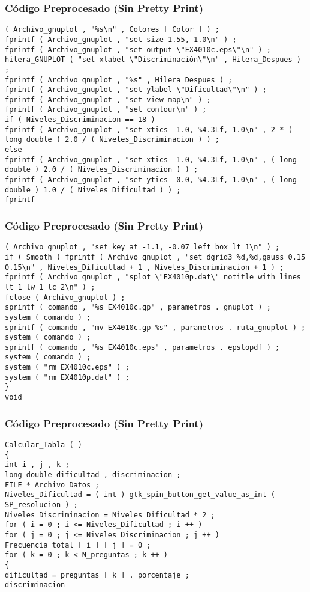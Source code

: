\documentclass{beamer}
\begin{document}
\begin{frame}[fragile]
\frametitle{C\'odigo Preprocesado (Sin Pretty Print)}
\begin{lstlisting}[style=CStyle]
( Archivo_gnuplot , "%s\n" , Colores [ Color ] ) ; 
fprintf ( Archivo_gnuplot , "set size 1.55, 1.0\n" ) ; 
fprintf ( Archivo_gnuplot , "set output \"EX4010c.eps\"\n" ) ; 
hilera_GNUPLOT ( "set xlabel \"Discriminación\"\n" , Hilera_Despues ) ; 
fprintf ( Archivo_gnuplot , "%s" , Hilera_Despues ) ; 
fprintf ( Archivo_gnuplot , "set ylabel \"Dificultad\"\n" ) ; 
fprintf ( Archivo_gnuplot , "set view map\n" ) ; 
fprintf ( Archivo_gnuplot , "set contour\n" ) ; 
if ( Niveles_Discriminacion == 18 ) 
fprintf ( Archivo_gnuplot , "set xtics -1.0, %4.3Lf, 1.0\n" , 2 * ( long double ) 2.0 / ( Niveles_Discriminacion ) ) ; 
else 
fprintf ( Archivo_gnuplot , "set xtics -1.0, %4.3Lf, 1.0\n" , ( long double ) 2.0 / ( Niveles_Discriminacion ) ) ; 
fprintf ( Archivo_gnuplot , "set ytics  0.0, %4.3Lf, 1.0\n" , ( long double ) 1.0 / ( Niveles_Dificultad ) ) ; 
fprintf \end{lstlisting}
\end{frame}
\begin{frame}[fragile]
\frametitle{C\'odigo Preprocesado (Sin Pretty Print)}
\begin{lstlisting}[style=CStyle]
( Archivo_gnuplot , "set key at -1.1, -0.07 left box lt 1\n" ) ; 
if ( Smooth ) fprintf ( Archivo_gnuplot , "set dgrid3 %d,%d,gauss 0.15 0.15\n" , Niveles_Dificultad + 1 , Niveles_Discriminacion + 1 ) ; 
fprintf ( Archivo_gnuplot , "splot \"EX4010p.dat\" notitle with lines lt 1 lw 1 lc 2\n" ) ; 
fclose ( Archivo_gnuplot ) ; 
sprintf ( comando , "%s EX4010c.gp" , parametros . gnuplot ) ; 
system ( comando ) ; 
sprintf ( comando , "mv EX4010c.gp %s" , parametros . ruta_gnuplot ) ; 
system ( comando ) ; 
sprintf ( comando , "%s EX4010c.eps" , parametros . epstopdf ) ; 
system ( comando ) ; 
system ( "rm EX4010c.eps" ) ; 
system ( "rm EX4010p.dat" ) ; 
} 
void \end{lstlisting}
\end{frame}
\begin{frame}[fragile]
\frametitle{C\'odigo Preprocesado (Sin Pretty Print)}
\begin{lstlisting}[style=CStyle]
Calcular_Tabla ( ) 
{ 
int i , j , k ; 
long double dificultad , discriminacion ; 
FILE * Archivo_Datos ; 
Niveles_Dificultad = ( int ) gtk_spin_button_get_value_as_int ( SP_resolucion ) ; 
Niveles_Discriminacion = Niveles_Dificultad * 2 ; 
for ( i = 0 ; i <= Niveles_Dificultad ; i ++ ) 
for ( j = 0 ; j <= Niveles_Discriminacion ; j ++ ) 
Frecuencia_total [ i ] [ j ] = 0 ; 
for ( k = 0 ; k < N_preguntas ; k ++ ) 
{ 
dificultad = preguntas [ k ] . porcentaje ; 
discriminacion \end{lstlisting}
\end{frame}
\end{document}
